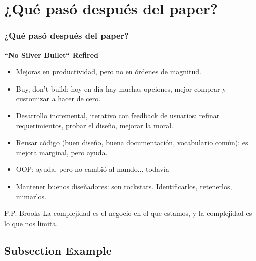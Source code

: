 \documentclass{beamer}
\begin{document}
\section{¿Qué pasó después del paper?}
\begin{frame}
  \frametitle{¿Qué pasó después del paper?}
  \textbf{``No Silver Bullet`` Refired}
  \begin{itemize}
    \item Mejoras en productividad, pero no en órdenes de magnitud.
    \item Buy, don't build: hoy en día hay muchas opciones, mejor comprar y customizar a hacer de cero.
    \item Desarrollo incremental, iterativo con feedback de usuarios: refinar requerimientos, probar el diseño, mejorar la moral.
    \item Reusar código (buen diseño, buena documentación, vocabulario común): es mejora marginal, pero ayuda.
    \item OOP: ayuda, pero no cambió al mundo... todavía
    \item Mantener buenos diseñadores: son rockstars. Identificarlos, retenerlos, mimarlos.
  \end{itemize}
  
  \begin{block}{F.P. Brooks}
La complejidad es el negocio en el que estamos, y la complejidad es lo que nos limita.
  \end{block}

\end{frame}




\subsection{Subsection Example} %
\end{document}
